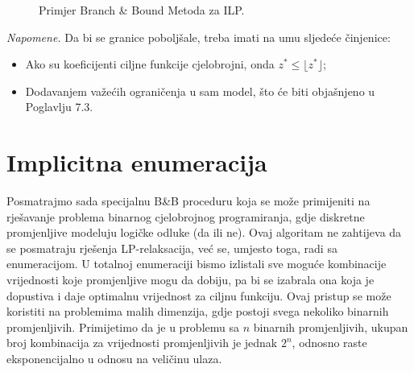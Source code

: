 \documentclass[a4paper, utf8, 11pt, colorlinks]{book}
\theoremstyle{definition}
\def\textA{$L_0$:\\
	$(x^*, y^*)=(2.25, 3.75)$ \\
	$z = 41.25$ \\
	 $z^* \leq 41$
	 
}
\def\textB{$\text{min}\  x_1-2x_2$\\
	subject to\\
	\hspace{1cm}\vdots
	\nodepart{two}
	{\scriptsize $x_1^*=1,x_2^*=2.1667$}
}
\def\textC{$L_1$:\\
	 $x^*=(1.8,  4)$\\
	 $z=41$ \\
	$z^* \leq 41$ 
}
\def\textD{$L_2$\\
	$x^*=(3, 3)$ \\
	$z = 39 = LB$
}
\def\textE{$L_3$:\\
	podproblem nedopustiv
 }
\def\textF{ $L_4$:\\
    $x^*=(1, 4\frac{4}{9})$ \\
    $z=40\frac{5}{9}$  \\
    $z^* \leq 40$
}
\def\textG{$L_5$: \\
	$x^*=(1, 4)$ \\
	$z=37<LB$
}
\def\textH{$L_6$: \\
	$x^*=(0, 5)$ \\
	$z=LB = 40 $
}
\begin{document}

\begin{figure}[!ht]
	\centering
	\caption{Primjer Branch \& Bound  Metoda za ILP.}
	\label{fig:bnb_ilp}
\end{figure}


\emph{Napomene.} Da bi se granice  poboljšale, treba imati na umu sljedeće činjenice:
\begin{itemize}
	\item Ako su koeficijenti ciljne funkcije cjelobrojni, onda $z^* \leq \lfloor z^* \rfloor$;
	\item Dodavanjem važećih ograničenja u sam model, što će biti objašnjeno u Poglavlju 7.3. 
\end{itemize}



\section{Implicitna enumeracija}
Posmatrajmo sada specijalnu B\&B proceduru koja se može primijeniti na rješavanje problema binarnog cjelobrojnog programiranja, gdje diskretne promjenljive modeluju logičke odluke (da ili ne). Ovaj algoritam ne zahtijeva da se posmatraju rješenja LP-relaksacija, već se, umjesto toga, radi sa enumeracijom. U totalnoj enumeraciji bismo izlistali sve moguće kombinacije vrijednosti koje promjenljive mogu da dobiju, pa bi se izabrala ona koja je dopustiva i daje optimalnu vrijednost za ciljnu funkciju. Ovaj pristup se može koristiti na problemima malih dimenzija, gdje postoji svega nekoliko binarnih promjenljivih. Primijetimo da je u problemu sa $n$ binarnih promjenljivih, ukupan broj kombinacija za vrijednosti promjenljivih je jednak $2^n$, odnosno raste eksponencijalno u odnosu na veličinu ulaza. 
\end{document}
